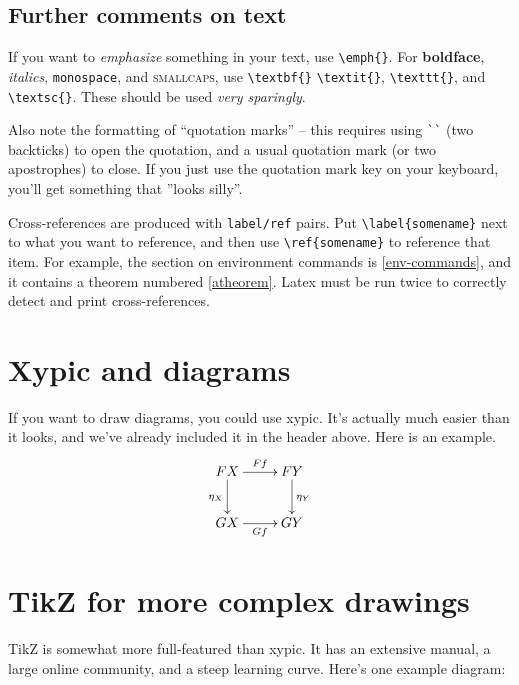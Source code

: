 \documentclass[11pt,oneside,draft]{amsart}
\begin{document}
\subsection{Further comments on text}

If you want to \emph{emphasize} something in your text, use
\verb|\emph{}|.  For \textbf{boldface}, \textit{italics},
\texttt{monospace}, and \textsc{smallcaps}, use \verb|\textbf{}|
\verb|\textit{}|, \verb|\texttt{}|, and \verb|\textsc{}|.  These
should be used \emph{very sparingly}.  

Also note the formatting of ``quotation marks'' -- this requires using
\verb|``| (two backticks) to open the quotation, and a usual quotation
mark (or two apostrophes) to close.  If you just use the quotation
mark key on your keyboard, you'll get something that ''looks silly''.

Cross-references are produced with \texttt{label/ref} pairs.  Put
\verb|\label{somename}| next to what you want to reference, and then
use \verb|\ref{somename}| to reference that item.  For example, the
section on environment commands is \ref{env-commands}, and it contains
a theorem numbered \ref{atheorem}.  Latex must be run twice to
correctly detect and print cross-references.

\section{Xypic and diagrams}

If you want to draw diagrams, you could use xypic.  It's actually
much easier than it looks, and we've already included it in the header
above.  Here is an example. 
\[\xymatrix{
FX \ar[r]^-{Ff} \ar[d]_{\eta_X} & FY \ar[d]^{\eta_Y} \\
GX \ar[r]_-{Gf} & GY\\} \]

\section{TikZ for more complex drawings}

TikZ is somewhat more full-featured than xypic.  It has an extensive
manual, a large online community, and a steep learning curve.  Here's one
example diagram:
\end{document}
